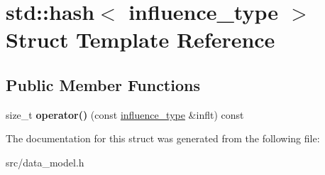 \hypertarget{structstd_1_1hash_3_01influence__type_01_4}{}\section{std\+:\+:hash$<$ influence\+\_\+type $>$ Struct Template Reference}
\label{structstd_1_1hash_3_01influence__type_01_4}
\subsection*{Public Member Functions}
\begin{DoxyCompactItemize}
\item 
\mbox{\label{structstd_1_1hash_3_01influence__type_01_4_a239c71c12f554f09d7711c188ea7774f}} 
size\+\_\+t {\bfseries operator()} (const \hyperlink{structinfluence__type}{influence\+\_\+type} \&inflt) const
\end{DoxyCompactItemize}


The documentation for this struct was generated from the following file\+:\begin{DoxyCompactItemize}
\item 
src/data\+\_\+model.\+h\end{DoxyCompactItemize}
